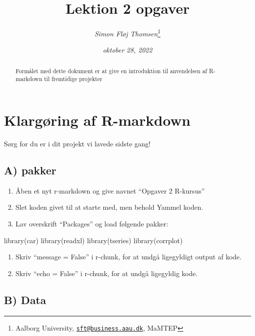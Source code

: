 \documentclass[
  12pt,
]{article}
\title{Lektion 2 opgaver}
\author{\emph{Simon Fløj Thomsen}\footnote{Aalborg University,
  \href{mailto:sft@business.aau.dk}{\nolinkurl{sft@business.aau.dk}},
  MaMTEP}}
\date{\emph{oktober 28, 2022}}
\newenvironment{Shaded}{\begin{snugshade}}{\end{snugshade}}
\newcommand{\FunctionTok}[1]{\textcolor[rgb]{0.00,0.00,0.00}{#1}}
\newcommand{\NormalTok}[1]{#1}
\providecommand{\tightlist}{%
  \setlength{\itemsep}{0pt}\setlength{\parskip}{0pt}}
\begin{document}
\maketitle
\begin{abstract}
\begingroup Formålet med dette dokument er at give en introduktion til
anvendelsen af R-markdown til fremtidige projekter \endgroup
\end{abstract}

\hypertarget{klarguxf8ring-af-r-markdown}{%
\section{Klargøring af R-markdown}\label{klarguxf8ring-af-r-markdown}}

Sørg for du er i dit projekt vi lavede sidste gang!

\hypertarget{a-pakker}{%
\subsection{A) pakker}\label{a-pakker}}

\begin{enumerate}
\def\labelenumi{\arabic{enumi}.}
\tightlist
\item
  Åben et nyt r-markdown og give navnet ``Opgaver 2 R-kursus''
\item
  Slet koden givet til at starte med, men behold Yammel koden.
\item
  Lav overskrift ``Packages'' og load følgende pakker:
\end{enumerate}

\begin{Shaded}
\begin{Highlighting}[]
\FunctionTok{library}\NormalTok{(car)}
\FunctionTok{library}\NormalTok{(readxl)}
\FunctionTok{library}\NormalTok{(tseries)}
\FunctionTok{library}\NormalTok{(corrplot)}
\end{Highlighting}
\end{Shaded}

\begin{enumerate}
\def\labelenumi{\arabic{enumi}.}
\setcounter{enumi}{3}
\tightlist
\item
  Skriv ``message = False'' i r-chunk, for at undgå ligegyldigt output
  af kode.
\item
  Skriv ``echo = False'' i r-chunk, for at undgå ligegyldig kode.
\end{enumerate}

\hypertarget{b-data}{%
\subsection{B) Data}\label{b-data}}
\end{document}
